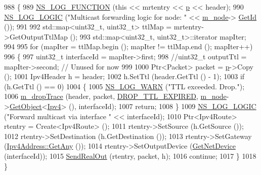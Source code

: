 \begin{DoxyCode}
988 \{
989   \hyperlink{log-macros-disabled_8h_a90b90d5bad1f39cb1b64923ea94c0761}{NS\_LOG\_FUNCTION} (\textcolor{keyword}{this} << mrtentry << \hyperlink{lte__link__budget_8m_ac9de518908a968428863f829398a4e62}{p} << header);
990   \hyperlink{group__logging_ga88acd260151caf2db9c0fc84997f45ce}{NS\_LOG\_LOGIC} (\textcolor{stringliteral}{"Multicast forwarding logic for node: "} << \hyperlink{classns3_1_1Ipv4L3Protocol_ad2cc5076c247724f1e99b398edc1965a}{m\_node}->
      \hyperlink{classns3_1_1Node_aaf49b64a843565ce3812326313b370ac}{GetId} ());
991 
992   std::map<uint32\_t, uint32\_t> ttlMap = mrtentry->GetOutputTtlMap ();
993   std::map<uint32\_t, uint32\_t>::iterator mapIter;
994 
995   \textcolor{keywordflow}{for} (mapIter = ttlMap.begin (); mapIter != ttlMap.end (); mapIter++)
996     \{
997       uint32\_t interfaceId = mapIter->first;
998       \textcolor{comment}{//uint32\_t outputTtl = mapIter->second;  // Unused for now}
999 
1000       Ptr<Packet> packet = \hyperlink{lte__link__budget_8m_ac9de518908a968428863f829398a4e62}{p}->Copy ();
1001       Ipv4Header h = header;
1002       h.SetTtl (header.GetTtl () - 1);
1003       \textcolor{keywordflow}{if} (h.GetTtl () == 0)
1004         \{
1005           \hyperlink{group__logging_gade7208b4009cdf0e25783cd26766f559}{NS\_LOG\_WARN} (\textcolor{stringliteral}{"TTL exceeded.  Drop."});
1006           \hyperlink{classns3_1_1Ipv4L3Protocol_a80984e2de6a2562b04195b975014cb1b}{m\_dropTrace} (header, packet, \hyperlink{classns3_1_1Ipv4L3Protocol_a05e7403d60c79529257c4cffdd994da1a95ecb5b7c1affd7ca7a6d3d34c38cd40}{DROP\_TTL\_EXPIRED}, 
      \hyperlink{classns3_1_1Ipv4L3Protocol_ad2cc5076c247724f1e99b398edc1965a}{m\_node}->\hyperlink{classns3_1_1Object_a13e18c00017096c8381eb651d5bd0783}{GetObject}<\hyperlink{classns3_1_1Ipv4_a1c15284fe630c76e0c9c75a97f1ff234}{Ipv4}> (), interfaceId);
1007           \textcolor{keywordflow}{return};
1008         \}
1009       \hyperlink{group__logging_ga88acd260151caf2db9c0fc84997f45ce}{NS\_LOG\_LOGIC} (\textcolor{stringliteral}{"Forward multicast via interface "} << interfaceId);
1010       Ptr<Ipv4Route> rtentry = Create<Ipv4Route> ();
1011       rtentry->SetSource (h.GetSource ());
1012       rtentry->SetDestination (h.GetDestination ());
1013       rtentry->SetGateway (\hyperlink{classns3_1_1Ipv4Address_a7a39b330c8e701183a411d5779fca1a4}{Ipv4Address::GetAny} ());
1014       rtentry->SetOutputDevice (\hyperlink{classns3_1_1Ipv4L3Protocol_a783709154b6f41b3a800b3e67369d501}{GetNetDevice} (interfaceId));
1015       \hyperlink{classns3_1_1Ipv4L3Protocol_ac1baf310b12bbc564d0766061ecca323}{SendRealOut} (rtentry, packet, h);
1016       \textcolor{keywordflow}{continue};
1017     \}
1018 \}
\end{DoxyCode}


